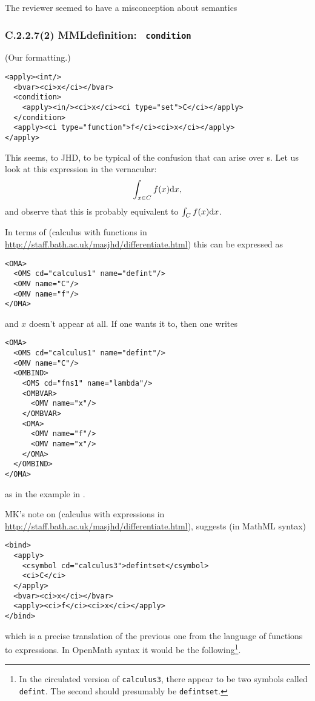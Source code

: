 \documentclass{llncs}
\begin{document}
\begin{newpart}{The reviewer seemed to have a misconception about semantics}
\subsubsection{C.2.2.7(2) MMLdefinition: {\tt
condition}}\label{sec:defintcond}\label{C2272}
(Our formatting.)
\begin{lstlisting}[language=MathML2]
<apply><int/>
  <bvar><ci>x</ci></bvar>
  <condition>
    <apply><in/><ci>x</ci><ci type="set">C</ci></apply>
  </condition>
  <apply><ci type="function">f</ci><ci>x</ci></apply>
</apply>
\end{lstlisting}
This seems, to JHD, to be typical of the confusion that can arise over
{}s. Let us look at this expression in the vernacular: 
\begin{equation}\label{defintcond}
\int_{x\in C}f(x){\rm d} x,
\end{equation}
and observe that this is probably equivalent to $\int_{C}f(x){\rm d} x$.
\par
In terms of {} (calculus with functions in
\url{http://staff.bath.ac.uk/masjhd/differentiate.html})
this can be expressed as 
\begin{lstlisting}
<OMA>
  <OMS cd="calculus1" name="defint"/>
  <OMV name="C"/>
  <OMV name="f"/>
</OMA>
\end{lstlisting}
and $x$ doesn't appear at all. If one wants it to, then one writes
\begin{lstlisting}
<OMA>
  <OMS cd="calculus1" name="defint"/>
  <OMV name="C"/>
  <OMBIND>
    <OMS cd="fns1" name="lambda"/>
    <OMBVAR>
      <OMV name="x"/>
    </OMBVAR>
    <OMA>
      <OMV name="f"/>
      <OMV name="x"/>
    </OMA>
  </OMBIND>
</OMA>
\end{lstlisting}
as in the example in {}.
\par
MK's note \cite{Kohlhase2008} on {} (calculus with
expressions in \url{http://staff.bath.ac.uk/masjhd/differentiate.html}),
suggests (in MathML syntax)
\begin{lstlisting}[language=MathML2]
<bind>
  <apply>
    <csymbol cd="calculus3">defintset</csymbol>
    <ci>C</ci>
  </apply>
  <bvar><ci>x</ci></bvar>
  <apply><ci>f</ci><ci>x</ci></apply>
</bind>
\end{lstlisting}
which is a precise translation of the previous one from the language of
functions to expressions.
In OpenMath syntax it would be the following\footnote{In the circulated
version of {\tt calculus3}, there appear to be two symbols called {\tt
defint}. The second should presumably be {\tt defintset}.}.

\end{newpart}
\end{document}
